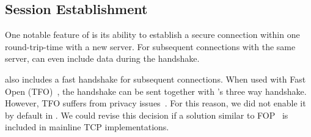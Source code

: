 \subsection{\tcpls Session Establishment}

One notable feature of \quic is its ability to establish a secure connection within one round-trip-time with a new server. For subsequent connections with the same server, \quic can even include data during the handshake.

 also includes a fast handshake for subsequent connections. When used with \tcp Fast Open (TFO)~\cite{radhakrishnan2011tcp}, the \tls handshake can be sent together with \tcp's three way handshake. However, TFO suffers from privacy issues~\cite{sy2020enhanced}. For this reason, we did not enable it by default in \tcpls. We could revise this decision if a solution similar to \tcp
FOP~\cite{sy2020enhanced} is included in mainline TCP implementations.



